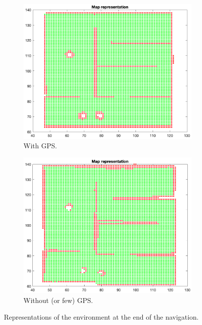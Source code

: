 \documentclass[a4paper, 10pt, conference]{ieeeconf}
\begin{document}
    \begin{figure}[!h]
        \centering
        \begin{subfigure}[b]{0.23\textwidth}
            \centering
            \includegraphics[width=\textwidth]{resources/png/map-gps.png}
            \caption{With GPS.}
            \label{fig:navigation.map.gps}
        \end{subfigure}
        \hfill
        \begin{subfigure}[b]{0.23\textwidth}
            \centering
            \includegraphics[width=\textwidth]{resources/png/map-nogps.png}
            \caption{Without (or few) GPS.}
            \label{fig:navigation.map.nogps}
        \end{subfigure}
        \caption{Representations of the environment at the end of the navigation.}
        \label{fig:navigation.map}
    \end{figure}
    
\end{document}
